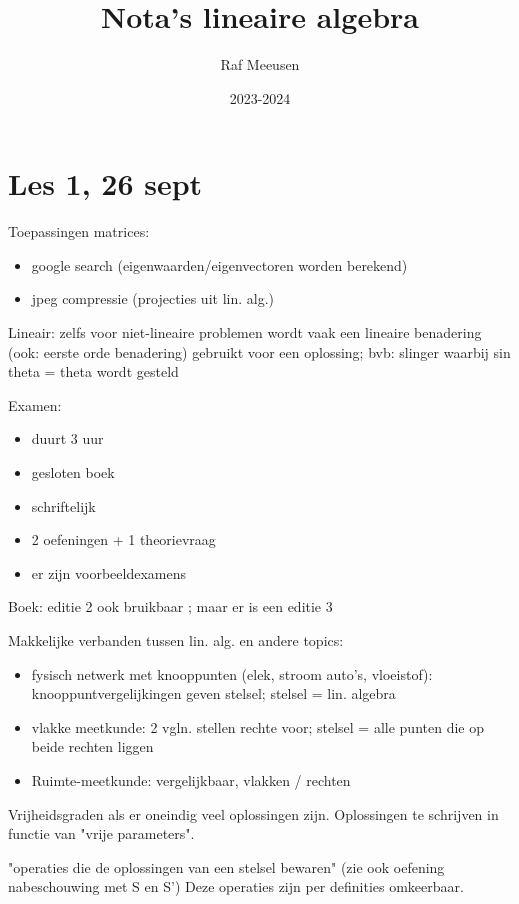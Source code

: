 \documentclass{article}
\title{Nota's lineaire algebra}
\author{Raf Meeusen}
\date{2023-2024}
\begin{document}
\maketitle

\section{Les 1, 26 sept}

Toepassingen matrices: 
\begin{itemize}
\item google search (eigenwaarden/eigenvectoren worden berekend) 
\item jpeg compressie (projecties uit lin. alg.) 
\end{itemize}


Lineair: zelfs voor niet-lineaire problemen wordt vaak een lineaire benadering (ook: eerste orde benadering) gebruikt voor een oplossing; bvb: slinger waarbij sin theta = theta wordt gesteld

Examen: 
\begin{itemize}
\item duurt 3 uur
\item gesloten boek
\item schriftelijk
\item 2 oefeningen + 1 theorievraag
\item er zijn voorbeeldexamens 
\end{itemize}

Boek: editie 2 ook bruikbaar ; maar er is een editie 3 

Makkelijke verbanden tussen lin. alg. en andere topics: 
\begin{itemize}
    \item fysisch netwerk met knooppunten (elek, stroom auto's, vloeistof): knooppuntvergelijkingen geven stelsel; stelsel = lin. algebra
    \item vlakke meetkunde: 2 vgln. stellen rechte voor; stelsel = alle punten die op beide rechten liggen
    \item Ruimte-meetkunde: vergelijkbaar, vlakken / rechten
\end{itemize}

Vrijheidsgraden als er oneindig veel oplossingen zijn. Oplossingen te schrijven in functie van "vrije parameters". 

"operaties die de oplossingen van een stelsel bewaren" 
(zie ook oefening nabeschouwing met S en S') 
Deze operaties zijn per definities omkeerbaar.  
\end{document}
